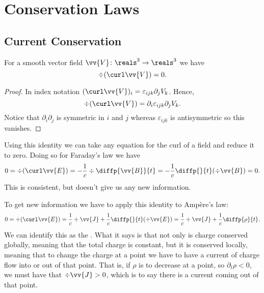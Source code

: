 \section{Conservation Laws}
\subsection{Current Conservation}
\begin{lma}{}{}
    For a smooth vector field \(\vv{V} \colon \reals^3 \to \reals^3\) we have
    \begin{equation}
        \div(\curl\vv{V}) = 0.
    \end{equation}
    \begin{proof}
        In index notation \((\curl\vv{V})_i = \varepsilon_{ijk}\partial_jV_k\).
        Hence,
        \begin{equation}
            \div(\curl\vv{V}) = \partial_i\varepsilon_{ijk}\partial_jV_k.
        \end{equation}
        Notice that \(\partial_i\partial_j\) is symmetric in \(i\) and \(j\) whereas \(\varepsilon_{ijk}\) is antisymmetric so this vanishes.
    \end{proof}
\end{lma}

Using this identity we can take any equation for the curl of a field and reduce it to zero.
Doing so for Faraday's law we have
\begin{equation}
    0 = \div(\curl\vv{E}) = -\frac{1}{c}\div\diffp{\vv{B}}{t} = -\frac{1}{c}\diffp{}{t}(\div\vv{B}) = 0.
\end{equation}
This is consistent, but doesn't give us any new information.

To get new information we have to apply this identity to Amp\`ere's law:
\begin{equation}
    0 = \div(\curl\vv{E}) = \frac{1}{c}\div\vv{J} + \frac{1}{c}\diffp{}{t}(\div\vv{E}) = \frac{1}{c}\div\vv{J} + \frac{1}{c}\diffp{\rho}{t}.
\end{equation}
We can identify this as the .
What it says is that not only is charge conserved globally, meaning that the total charge is constant, but it is conserved locally, meaning that to change the charge at a point we have to have a current of charge flow into or out of that point.
That is, if \(\rho\) is to decrease at a point, so \(\partial_t\rho < 0\), we must have that \(\div\vv{J} > 0\), which is to say there is a current coming out of that point.

